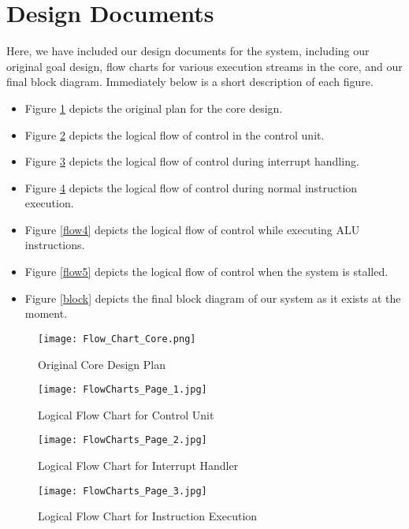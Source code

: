 \documentclass{article}
\begin{document}
\section{Design Documents}
Here, we have included our design documents for the system, including our original goal design, flow charts for various execution streams in the core, and our final block diagram.  Immediately below is a short description of each figure.
\begin{itemize}
    \item Figure \ref{flow} depicts the original plan for the core design.
    \item Figure \ref{flow1} depicts the logical flow of control in the control unit.
    \item Figure \ref{flow2} depicts the logical flow of control during interrupt handling.
    \item Figure \ref{flow3} depicts the logical flow of control during normal instruction execution.
    \item Figure \ref{flow4} depicts the logical flow of control while executing ALU instructions.
    \item Figure \ref{flow5} depicts the logical flow of control when the system is stalled.
    \item Figure \ref{block} depicts the final block diagram of our system as it exists at the moment.
\end{itemize}

\begin{figure}[H]
\caption{Original Core Design Plan}
\label{flow}
\centering
\texttt{[image: Flow\_Chart\_Core.png]}
\end{figure}


\begin{figure}[H]
\caption{Logical Flow Chart for Control Unit}
\label{flow1}
\centering
\texttt{[image: FlowCharts\_Page\_1.jpg]}
\end{figure}

\begin{figure}[H]
\caption{Logical Flow Chart for Interrupt Handler}
\label{flow2}
\centering
\texttt{[image: FlowCharts\_Page\_2.jpg]}
\end{figure}

\begin{figure}[H]
\caption{Logical Flow Chart for Instruction Execution}
\label{flow3}
\centering
\texttt{[image: FlowCharts\_Page\_3.jpg]}
\end{figure}
\end{document}
